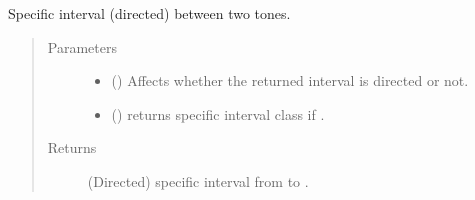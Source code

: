 \documentclass[letterpaper,10pt,english]{sphinxmanual}
\begin{document}
\begin{fulllineitems}
\begin{fulllineitems}
\begin{sphinxVerbatim}[commandchars=\\\{\}]
    
\end{sphinxVerbatim}

\begin{sphinxVerbatim}[commandchars=\\\{\}]
    
\end{sphinxVerbatim}

\end{fulllineitems}



\begin{fulllineitems}
Specific interval (directed) between two tones.
\begin{quote}\begin{description}
\item[{Parameters}] \leavevmode\begin{itemize}
\item {} 
 () \textendash{} Affects whether the returned interval is directed or not.

\item {} 
 () \textendash{} returns specific interval class if .

\end{itemize}

\item[{Returns}] \leavevmode
(Directed) specific interval from  to .


\end{description}
\end{quote}
\end{fulllineitems}
\end{fulllineitems}
\end{document}
